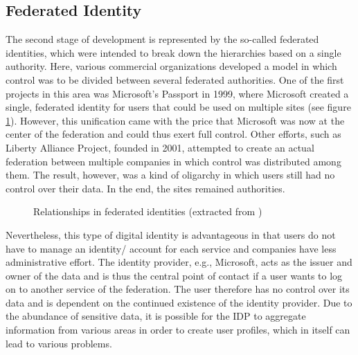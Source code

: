 	    
	    \subsection{Federated Identity}
	    
	    The second stage of development is represented by the so-called federated identities, which were intended to break down the hierarchies based on a single authority. Here, various commercial organizations developed a model in which control was to be divided between several federated authorities. One of the first projects in this area was Microsoft's Passport in 1999, where Microsoft created a single, federated identity for users that could be used on multiple sites (see figure \ref{figure: federated}). However, this unification came with the price that Microsoft was now at the center of the federation and could thus exert full control. Other efforts, such as Liberty Alliance Project, founded in 2001, attempted to create an actual federation between multiple companies in which control was distributed among them. The result, however, was a kind of oligarchy in which users still had no control over their data. In the end, the sites remained authorities. \cite{allen_path_2016}
	    
	    \begin{figure}[ht]
    	    \centering
    	    \makebox[\textwidth]{}
            \caption[Relationships in federated identities]{Relationships in federated identities (extracted from \cite[p. 8]{preukschat_self-sovereign_2021})}
            \label{figure: federated}
        \end{figure}
	    
	    Nevertheless, this type of digital identity is advantageous in that users do not have to manage an identity/ account for each service and companies have less administrative effort. The identity provider, e.g., Microsoft, acts as the issuer and owner of the data and is thus the central point of contact if a user wants to log on to another service of the federation. The user therefore has no control over its data and is dependent on the continued existence of the identity provider. Due to the abundance of sensitive data, it is possible for the \ac{IDP} to aggregate information from various areas in order to create user profiles, which in itself can lead to various problems. \cite[pp. 6 - 7]{ehrlich_self-sovereign_2021}
	    
